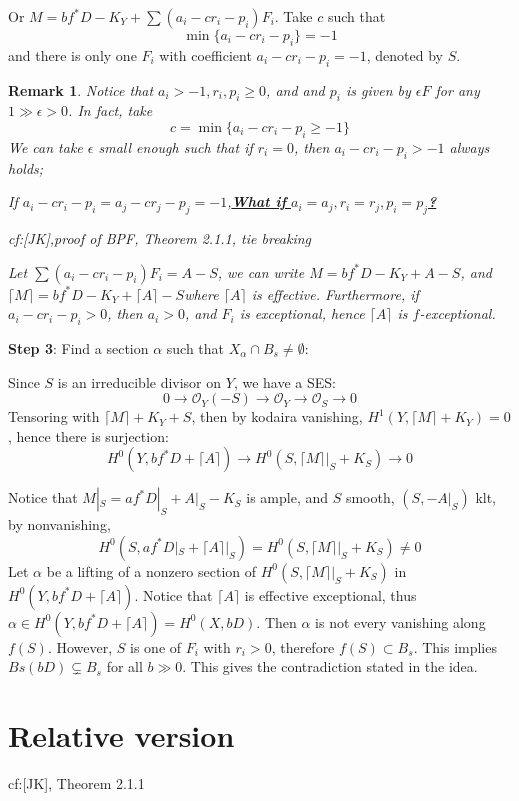 \documentclass{article}
\newtheorem{rmk}[defn]{Remark}
\begin{document}
Or $ M=bf^*D-K_Y+\sum (a_i-cr_i-p_i)F_i $. Take $ c $ such that 
$$ \min\{ a_i-cr_i-p_i \}=-1 $$
 and there is only one $ F_i $ with coefficient $ a_i-cr_i-p_i=-1 $, denoted by $ S $.
 \begin{rmk}
 	Notice that $ a_i>-1, r_i,p_i\geqslant0 $, and and $ p_i $ is given by $ \epsilon F $ for any $ 1\gg \epsilon>0 $. In fact, take 
 	$$ c=\min\{  a_i-cr_i-p_i\geqslant -1\} $$
 	We can take $ \epsilon $ small enough such that if $ r_i=0 $, then $ a_i-cr_i-p_i>-1 $ always holds; 
 	
 	If $ a_i-cr_i-p_i=a_j-cr_j-p_j=-1 $,\underline{\textbf{What if } $ a_i=a_j,r_i=r_j,p_i=p_j $\textbf{?}}
 	
 	cf:[JK],proof of BPF, Theorem 2.1.1, \textit{tie breaking}
 	
	Let $ \sum (a_i-cr_i-p_i)F_i=A-S $, we can write $ M=bf^*D-K_Y+A-S $, and $ \lceil M\rceil =bf^*D-K_Y+\lceil A\rceil-S $where $ \lceil A\rceil $ is effective. Furthermore, if $ a_i-cr_i-p_i>0 $, then $ a_i>0 $, and $ F_i $ is exceptional, hence $ \lceil A\rceil $ is $ f $-exceptional. 
 \end{rmk}
\textbf{Step 3}: Find a section $ \alpha $ such that $ X_\alpha\cap B_s\neq \emptyset  $:

Since $ S $ is an irreducible divisor on $ Y $, we have a SES:
$$ 0\to \mathcal{O}_Y(-S)\to \mathcal{O}_Y\to \mathcal{O}_S\to 0 $$
Tensoring with $ \lceil M\rceil +K_Y+S $, then by kodaira vanishing, $ H^1(Y,\lceil M\rceil +K_Y)=0 $, hence there is surjection:
$$ H^0(Y,bf^*D+\lceil A\rceil)\to H^0(S,\lceil M\rceil|_S +K_S)\to 0 $$

Notice that $ M|_S=af^*D|_S+A|_S-K_S $ is ample, and $ S $ smooth, $ (S,-A|_S) $ klt, by nonvanishing, 
$$ H^0(S,af^*D|_S+\lceil A\rceil|_S)=H^0(S,\lceil M\rceil|_S +K_S)\neq 0 $$
Let $ \alpha $ be a lifting of a nonzero section of $ H^0(S,\lceil M\rceil|_S +K_S) $ in $ H^0(Y,bf^*D+\lceil A\rceil) $. Notice that $ \lceil A\rceil $ is effective exceptional, thus $ \alpha \in H^0(Y,bf^*D+\lceil A\rceil)=H^0(X,bD) $. Then $ \alpha $ is not every vanishing along $ f(S) $. However, $ S $ is one of $ F_i $ with $ r_i>0 $, therefore $ f(S)\subset B_s $. This implies $ Bs(bD)\subsetneq B_s $ for all $ b\gg 0 $. This gives the contradiction stated in the idea.



\section{Relative version}
cf:[JK], Theorem 2.1.1
\end{document}
